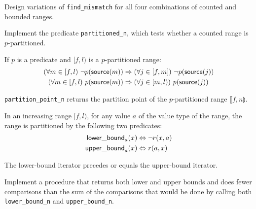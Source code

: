 \begin{exercise}
	Design variations of \verb|find_mismatch| for all four combinations of counted
	and bounded ranges.
\end{exercise}



\begin{exercise}
	Implement the predicate \verb|partitioned_n|, which tests whether a counted
	range is $p$-partitioned.
\end{exercise}



\begin{lemma}
	If $p$ is a predicate and $[f, l)$ is a $p$-partitioned range:
	\begin{align*}
		(\forall m \in [f, l)\ \lnot p(\mathsf{source}(m)) &\Rightarrow (\forall j \in [f, m])\ \lnot p(\mathsf{source}(j))\\
		(\forall m \in [f, l)\ p(\mathsf{source}(m)) &\Rightarrow (\forall j \in [m, l))\ p(\mathsf{source}(j))
	\end{align*}
\end{lemma}

\begin{lemma}
	\verb|partition_point_n| returns the partition point of the $p$-partitioned range
	$\llbracket f, n \rrparenthesis$.
\end{lemma}

\begin{lemma}
	In an increasing range $[f, l)$, for any value $a$ of the value type of the range,
	the range is partitioned by the following two predicates:
	\begin{align*}
		\mathsf{lower\_bound}_a(x) &\Leftrightarrow \lnot r(x, a)\\
		\mathsf{upper\_bound}_a(x) &\Leftrightarrow r(a, x)
	\end{align*}
\end{lemma}

\begin{lemma}
	The lower-bound iterator precedes or equals the upper-bound iterator.
\end{lemma}

\begin{exercise}
	Implement a procedure that returns both lower and upper bounds and does fewer
	comparisons than the sum of the comparisons that would be done by calling both
	\verb|lower_bound_n| and \verb|upper_bound_n|.
\end{exercise}


